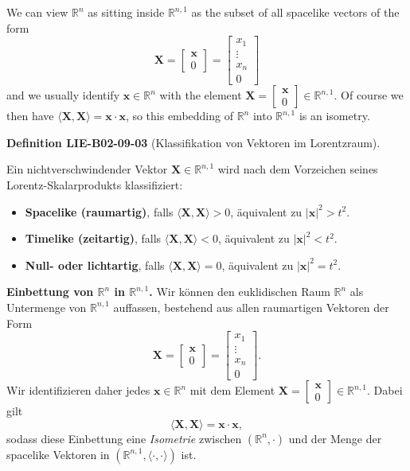 \documentclass[10pt, letterpaper]{article}
\newcommand{\CustomHeading}[3]{%
  \par\medskip\noindent%
  \textbf{#1 #2} \textnormal{(#3)}.\enskip%
}
\newenvironment{DEF}[2]{\begin{unitbox}\CustomHeading{Definition}{#1}{#2}}{\end{unitbox}}
\begin{document}
We can view $\mathbb{R}^{n}$ as sitting inside $\mathbb{R}^{n, 1}$ as the subset of all spacelike vectors of the form
$$
\mathbf{X}=\left[\begin{array}{c}
\mathbf{x} \\
0
\end{array}\right]=\left[\begin{array}{c}
x_{1} \\
\vdots \\
x_{n} \\
0
\end{array}\right]
$$
and we usually identify $\mathbf{x} \in \mathbb{R}^{n}$ with the element $\mathbf{X}=\left[\begin{array}{c}\mathbf{x} \\ 0\end{array}\right] \in \mathbb{R}^{n, 1}$. Of course we then have $\langle\mathbf{X}, \mathbf{X}\rangle=\mathbf{x} \cdot \mathbf{x}$, so this embedding of $\mathbb{R}^{n}$ into $\mathbb{R}^{n, 1}$ is an isometry.




\begin{DEF}{LIE-B02-09-03}{Klassifikation von Vektoren im Lorentzraum}
Ein nichtverschwindender Vektor
\(\mathbf{X}\in\mathbb{R}^{n,1}\) wird nach dem Vorzeichen seines
Lorentz-Skalarprodukts klassifiziert:
\begin{itemize}
  \item \textbf{Spacelike (raumartig)}, falls
  \(\langle \mathbf{X},\mathbf{X}\rangle > 0\),
  äquivalent zu \(|\mathbf{x}|^2 > t^2\).
  \item \textbf{Timelike (zeitartig)}, falls
  \(\langle \mathbf{X},\mathbf{X}\rangle < 0\),
  äquivalent zu \(|\mathbf{x}|^2 < t^2\).
  \item \textbf{Null- oder lichtartig}, falls
  \(\langle \mathbf{X},\mathbf{X}\rangle = 0\),
  äquivalent zu \(|\mathbf{x}|^2 = t^2\).
\end{itemize}

\textbf{Einbettung von \(\mathbb{R}^n\) in \(\mathbb{R}^{n,1}\).}
Wir können den euklidischen Raum \(\mathbb{R}^n\) als Untermenge von
\(\mathbb{R}^{n,1}\) auffassen, bestehend aus allen
raumartigen Vektoren der Form
\[
\mathbf{X}=
\begin{bmatrix}
\mathbf{x}\\0
\end{bmatrix}
=
\begin{bmatrix}
x_1\\
\vdots\\
x_n\\
0
\end{bmatrix}.
\]
Wir identifizieren daher jedes \(\mathbf{x}\in\mathbb{R}^n\)
mit dem Element
\(\mathbf{X}=\begin{bmatrix}\mathbf{x}\\0\end{bmatrix}\in\mathbb{R}^{n,1}\).
Dabei gilt
\[
\langle \mathbf{X},\mathbf{X}\rangle
= \mathbf{x}\cdot \mathbf{x},
\]
sodass diese Einbettung eine \emph{Isometrie}
zwischen \((\mathbb{R}^n,\cdot)\) und der Menge der spacelike Vektoren in
\((\mathbb{R}^{n,1},\langle\cdot,\cdot\rangle)\) ist.
\end{DEF}
\end{document}

